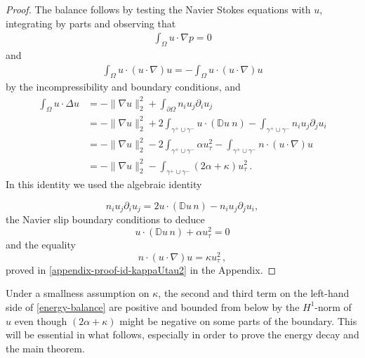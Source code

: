 \documentclass{article}
\theoremstyle{definition}
\theoremstyle{definition}
\begin{document}
\begin{proof}
The balance follows by testing the Navier Stokes equations with $u$, integrating by parts and observing that
\begin{align*}
    \int_\Omega u \cdot \nabla p
    =0
\end{align*}
and
\begin{align*}
    \int_\Omega u \cdot (u\cdot \nabla ) u 
    =-\int_\Omega u\cdot (u\cdot\nabla)u
\end{align*}
by the incompressibility and boundary conditions, and
\begin{align*}
    \int_\Omega u\cdot \Delta u
    &=-\|\nabla u\|_2^2 +\int_{\partial \Omega} n_i u_j\partial_i u_j
    \\
    &= -\|\nabla u\|_2^2 +2 \int_{\gamma^+\cup \gamma^-} u\cdot(\mathbb{D}u\ n) -\int_{\gamma^+\cup \gamma^-} n_iu_j \partial_j u_i\\
    &= -\|\nabla u\|_2^2 - 2\int_{\gamma^+\cup \gamma^-} \alpha u_{\tau}^2 -\int_{\gamma^+\cup \gamma^-} n\cdot (u\cdot \nabla) u
    \\
    &= -\|\nabla u\|_2^2 - \int_{\gamma^+\cup \gamma^-} (2\alpha+\kappa) u_\tau^2\,.
\end{align*}
In this identity we used the algebraic identity

\begin{equation*}
    n_iu_j\partial_iu_j=2u\cdot(\mathbb{D}u \,n)-n_iu_j\partial_ju_i,    
\end{equation*}
the Navier slip boundary conditions to deduce
\begin{equation*}
    u\cdot(\mathbb{D}u \,n)+\alpha u_{\tau}^2=0  
\end{equation*}
and the equality
\begin{equation}
    \label{id-kappaUtau2-1}
    n\cdot(u\cdot \nabla)u=\kappa u_{\tau}^2\,,
\end{equation}
proved in \eqref{appendix-proof-id-kappaUtau2} in the Appendix.

\end{proof}


Under a smallness assumption on $\kappa$, the second and third term on the left-hand side of \eqref{energy-balance} are positive and bounded from below by the $H^1$-norm of $u$ even though $(2\alpha+\kappa)$ might be negative on some parts of the boundary. This will be essential in what follows, especially in order to prove the energy decay and the main theorem.
\end{document}

